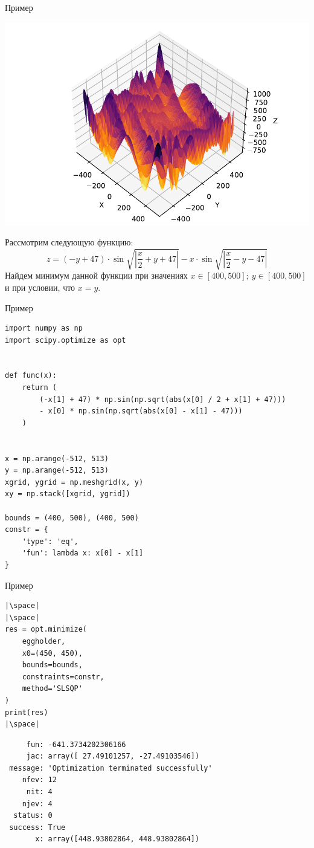 \documentclass[aspectratio=169, mathserif]{beamer}%
\begin{document}
\begin{frame}[fragile, label=c]{Пример}
\scriptsize
\begin{minipage}{.52\textwidth}
\includegraphics[width=.9\linewidth]{./pics/eggholder}
\end{minipage}
\begin{minipage}{.47\textwidth}
Рассмотрим следующую функцию:
\vfill
\begin{equation*}
z = \left(-y + 47\right) \cdot \sin \sqrt{\left|\dfrac{x}{2} + y + 47\right|} - x \cdot \sin \sqrt{\left|\dfrac{x}{2} - y - 47\right|}
\end{equation*}
\vfill
Найдем минимум данной функции при значениях $x \in \left[400, 500\right];\ y \in \left[400, 500\right]$ и при условии, что $x = y$.
\end{minipage}
\vfill
\end{frame}


\begin{frame}[fragile, label=c]{Пример}
\scriptsize
\begin{verbatim}
import numpy as np
import scipy.optimize as opt


def func(x):
    return (
        (-x[1] + 47) * np.sin(np.sqrt(abs(x[0] / 2 + x[1] + 47)))
        - x[0] * np.sin(np.sqrt(abs(x[0] - x[1] - 47)))
    )


x = np.arange(-512, 513)
y = np.arange(-512, 513)
xgrid, ygrid = np.meshgrid(x, y)
xy = np.stack([xgrid, ygrid])

bounds = (400, 500), (400, 500)
constr = {
    'type': 'eq',
    'fun': lambda x: x[0] - x[1]
}
\end{verbatim}
\vfill
\end{frame}


\begin{frame}[fragile, label=c]{Пример}
\scriptsize
\begin{verbatim}
|\space|
|\space|
res = opt.minimize(
    eggholder,
    x0=(450, 450),
    bounds=bounds,
    constraints=constr,
    method='SLSQP'
)
print(res)
|\space|
\end{verbatim}
\vfill
\begin{verbatim}
     fun: -641.3734202306166
     jac: array([ 27.49101257, -27.49103546])
 message: 'Optimization terminated successfully'
    nfev: 12
     nit: 4
    njev: 4
  status: 0
 success: True
       x: array([448.93802864, 448.93802864])
\end{verbatim}
\vfill
\end{frame}
\end{document}
